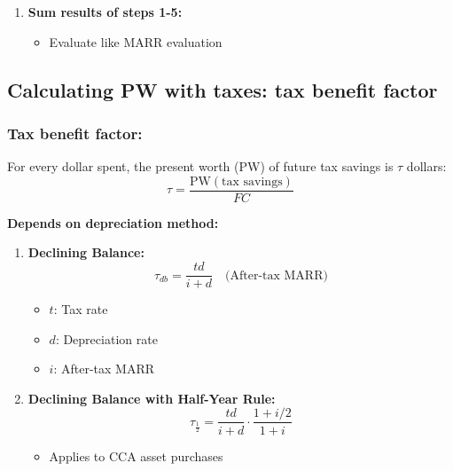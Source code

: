 \begin{process}
\begin{enumerate}
        \item \textbf{Sum results of steps 1-5:}
        \begin{itemize}
            \item Evaluate like MARR evaluation
        \end{itemize}
    \end{enumerate}
\end{process}

\subsection{Calculating PW with taxes: tax benefit factor}
\subsubsection{Tax benefit factor:}
    \begin{definition}
        For every dollar spent, the present worth (PW) of future tax savings is $\tau$ dollars:
        \begin{equation}
            \tau = \frac{\text{PW}(\text{tax savings})}{FC}
        \end{equation}
        \vspace{1em}

        \textbf{Depends on depreciation method:}
        \begin{enumerate}
            \item \textbf{Declining Balance:}
            \begin{equation}
                \tau_{db} = \frac{td}{i + d} \quad \text{(After-tax MARR)}
            \end{equation}
            \begin{itemize}
                \item \( t \): Tax rate 
                \item \( d \): Depreciation rate
                \item \( i \): After-tax MARR
            \end{itemize}
            
            \item \textbf{Declining Balance with Half-Year Rule:}
            \begin{equation}
                \tau_{\frac{1}{2}} = \frac{td}{i + d} \cdot \frac{1 + i/2}{1 + i} 
            \end{equation}
            \begin{itemize}
                \item Applies to CCA asset purchases
            \end{itemize}
        \end{enumerate}
    \end{definition}

